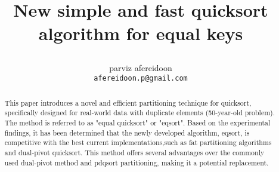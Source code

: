 \documentclass{article}
\begin{document}
\title{New simple and fast  quicksort algorithm for equal keys

 }
 \author { parviz afereidoon\\
\texttt{afereidoon.p@gmail.com}
}

\begin {abstract}
This paper introduces a  novel and efficient partitioning technique for quicksort, specifically designed for real-world data with duplicate elements (50-year-old problem). The method is referred to as "equal quicksort" or "eqsort". Based on the experimental findings, it has been determined that the newly developed algorithm, eqsort, is competitive with the best current implementations,such as fat partitioning algorithms and dual-pivot quicksort. This method offers several advantages over the commonly used dual-pivot method and pdqsort partitioning, making it a potential replacement.\\
\\
\\
\end {abstract}

\maketitle
\end{document}
